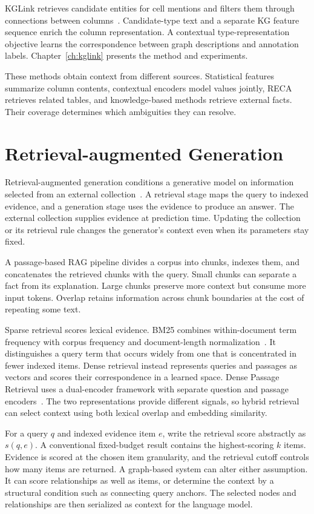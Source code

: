 KGLink retrieves candidate entities for cell mentions and filters them through connections between columns~\cite{bg-kglink}. Candidate-type text and a separate KG feature sequence enrich the column representation. A contextual type-representation objective learns the correspondence between graph descriptions and annotation labels. Chapter~\ref{ch:kglink} presents the method and experiments.

These methods obtain context from different sources. Statistical features summarize column contents, contextual encoders model values jointly, RECA retrieves related tables, and knowledge-based methods retrieve external facts. Their coverage determines which ambiguities they can resolve.

\section{Retrieval-augmented Generation}
\label{sec:background:rag}

Retrieval-augmented generation conditions a generative model on information selected from an external collection~\cite{bg-rag}. A retrieval stage maps the query to indexed evidence, and a generation stage uses the evidence to produce an answer. The external collection supplies evidence at prediction time. Updating the collection or its retrieval rule changes the generator's context even when its parameters stay fixed.

A passage-based RAG pipeline divides a corpus into chunks, indexes them, and concatenates the retrieved chunks with the query. Small chunks can separate a fact from its explanation. Large chunks preserve more context but consume more input tokens. Overlap retains information across chunk boundaries at the cost of repeating some text.

Sparse retrieval scores lexical evidence. BM25 combines within-document term frequency with corpus frequency and document-length normalization~\cite{bg-bm25}. It distinguishes a query term that occurs widely from one that is concentrated in fewer indexed items. Dense retrieval instead represents queries and passages as vectors and scores their correspondence in a learned space. Dense Passage Retrieval uses a dual-encoder framework with separate question and passage encoders~\cite{bg-dpr}. The two representations provide different signals, so hybrid retrieval can select context using both lexical overlap and embedding similarity.

For a query $q$ and indexed evidence item $e$, write the retrieval score abstractly as $s(q,e)$. A conventional fixed-budget result contains the highest-scoring $k$ items. Evidence is scored at the chosen item granularity, and the retrieval cutoff controls how many items are returned. A graph-based system can alter either assumption. It can score relationships as well as items, or determine the context by a structural condition such as connecting query anchors. The selected nodes and relationships are then serialized as context for the language model.

